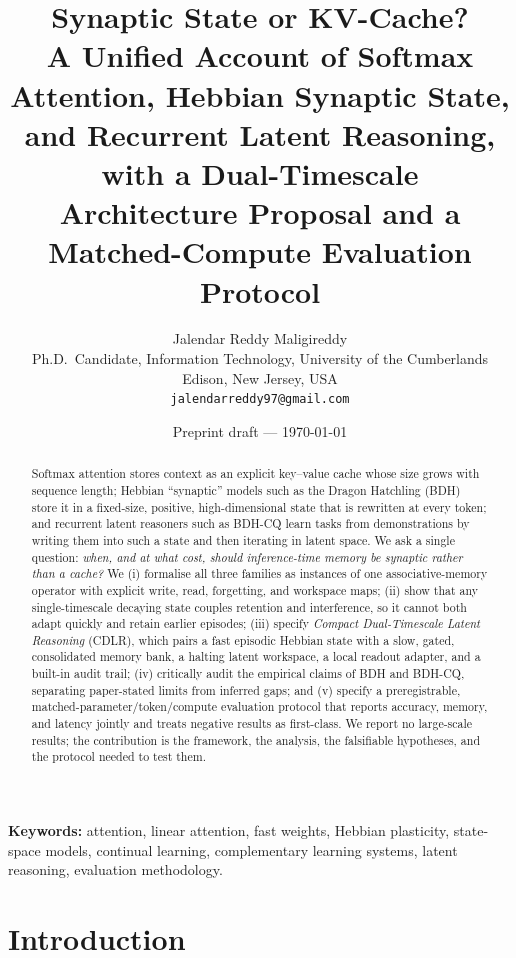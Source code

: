 \documentclass[11pt]{article}
\title{\textbf{Synaptic State or KV-Cache?}\\[2pt]
\large A Unified Account of Softmax Attention, Hebbian Synaptic State, and Recurrent Latent Reasoning,\\
with a Dual-Timescale Architecture Proposal and a Matched-Compute Evaluation Protocol}
\author{Jalendar Reddy Maligireddy\\
Ph.D.\ Candidate, Information Technology, University of the Cumberlands\\
Edison, New Jersey, USA\\
\texttt{jalendarreddy97@gmail.com}}
\date{Preprint draft --- \today}
\theoremstyle{remark}
\newcommand{\cdlr}{\textsc{CDLR}}
\begin{document}
\maketitle

\begin{abstract}
Softmax attention stores context as an explicit key--value cache whose size grows with sequence length; Hebbian
``synaptic'' models such as the Dragon Hatchling (BDH) store it in a fixed-size, positive, high-dimensional state
that is rewritten at every token; and recurrent latent reasoners such as BDH-CQ learn tasks from demonstrations by
writing them into such a state and then iterating in latent space. We ask a single question: \emph{when, and at what
cost, should inference-time memory be synaptic rather than a cache?} We (i) formalise all three families as
instances of one associative-memory operator with explicit write, read, forgetting, and workspace maps; (ii) show
that any single-timescale decaying state couples retention and interference, so it cannot both adapt quickly and
retain earlier episodes; (iii) specify \emph{Compact Dual-Timescale Latent Reasoning} (\cdlr), which pairs a fast
episodic Hebbian state with a slow, gated, consolidated memory bank, a halting latent workspace, a local readout
adapter, and a built-in audit trail; (iv) critically audit the empirical claims of BDH and BDH-CQ, separating
paper-stated limits from inferred gaps; and (v) specify a preregistrable, matched-parameter/token/compute
evaluation protocol that reports accuracy, memory, and latency jointly and treats negative results as first-class.
We report no large-scale results; the contribution is the framework, the analysis, the falsifiable hypotheses, and
the protocol needed to test them.
\end{abstract}

\noindent\textbf{Keywords:} attention, linear attention, fast weights, Hebbian plasticity, state-space models,
continual learning, complementary learning systems, latent reasoning, evaluation methodology.

\section{Introduction}
\label{sec:intro}
\end{document}
